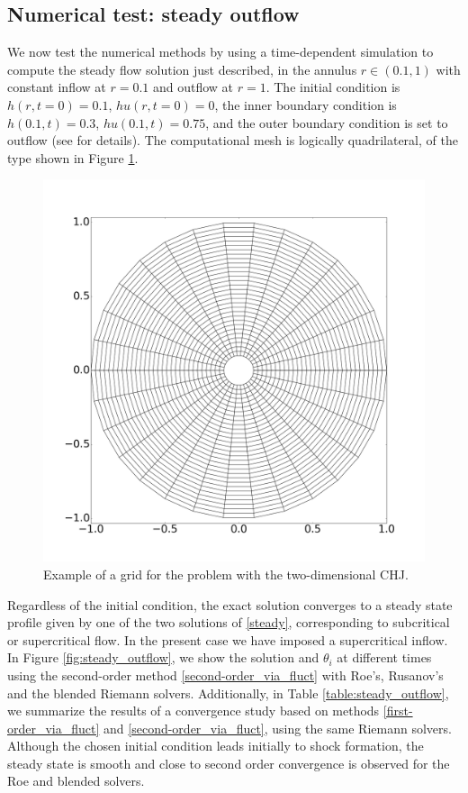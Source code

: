\documentclass[preprint, 11pt]{article}
\begin{document}
\subsection{Numerical test: steady outflow}\label{sec:steady_outflow}
We now test the numerical methods by using a time-dependent simulation
to compute the steady flow solution just described, 
in the annulus $r\in(0.1,1)$ with constant inflow at $r=0.1$ and outflow at $r=1$.
The initial condition is
$h(r,t=0)=0.1$, $hu(r,t=0)=0$, the inner boundary condition is $h(0.1,t)=0.3$, $hu(0.1,t)=0.75$,
and the outer boundary condition is set to outflow
(see \cite[\S 21.8.5]{leveque2002finite} for details).
The computational mesh is logically quadrilateral, of the type shown in
Figure \ref{fig:mesh_chj}.
\begin{figure}[!h]
  \centering 
  \includegraphics[scale=0.15]{figures/mesh.png}
  \caption{
    Example of a grid for the problem with the two-dimensional CHJ.
    \label{fig:mesh_chj}}
\end{figure}
Regardless of the initial condition, the exact solution converges to a
steady state profile given by one of the two solutions of \eqref{steady},
corresponding to subcritical or supercritical flow.  In the present case we
have imposed a supercritical inflow.
In Figure \ref{fig:steady_outflow}, we show the solution and $\theta_i$ at different times using
the second-order method \eqref{second-order_via_fluct}
with Roe's, Rusanov's and the blended Riemann solvers.  
Additionally, in Table \ref{table:steady_outflow}, we summarize the results of a convergence study
based on methods \eqref{first-order_via_fluct} and
\eqref{second-order_via_fluct}, using the same Riemann solvers.
Although the chosen initial
condition leads initially to shock formation, the steady state is smooth and close to
second order convergence is observed for the Roe and blended solvers.
\end{document}
